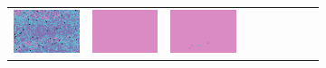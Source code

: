 \documentclass{ipol}
\begin{document}
\begin{figure}[ht]
\begin{subfigure}[t]{\linewidth}
\begin{tabular}{ccccccccc}
                \includegraphics[width=\s]{images/tower/DHT/bid_64_grids.png}&
                \includegraphics[width=\s]{images/tower/LINEAR/bid_64_grids.png}&
                \includegraphics[width=\s]{images/tower/PPG/bid_64_grids.png}&

\end{tabular}
\end{subfigure}
\end{figure}
\end{document}
